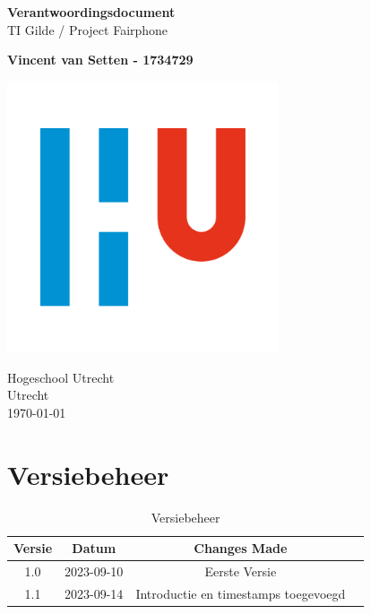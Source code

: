\documentclass[a4paper]{report}
\begin{document}
\begin{titlepage}
    \begin{center}
        \vspace*{1cm}
        \Huge
        \textbf{Verantwoordingsdocument}\\
        \vspace{0.5cm}\Large
        TI Gilde / Project Fairphone

        \normalsize

        \vspace{0.5cm}
        \textbf{Vincent van Setten - 1734729}
        \vfill

        \vspace{0.8cm}

        \includegraphics[width=0.6\textwidth]{Images/logouni.png}

        Hogeschool Utrecht\\
        Utrecht\\
        \today
    \end{center}
\end{titlepage}


\tableofcontents

\chapter{Versiebeheer}
\begin{table}[h]
    \centering
    \begin{tabular}{|c|c|c|p{5cm}|}
        \hline
        Versie & Datum      & Changes Made  \\
        \hline
        1.0    & 2023-09-10 & Eerste Versie \\
        \hline
        1.1    & 2023-09-14 & Introductie en timestamps toegevoegd\\
        \hline
    \end{tabular}
    \caption{Versiebeheer}
\end{table}
\end{document}
